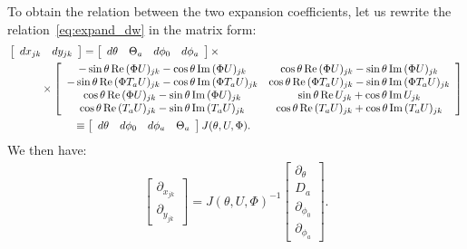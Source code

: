 \documentclass[12pt]{article}
\begin{document}
To obtain the relation between the two expansion coefficients,
let us rewrite the relation~\eqref{eq:expand_dw}
in the matrix form:
\begin{align}
  &\left[
    \begin{array}{c c}
      dx_{jk}
      &
        dy_{jk}
    \end{array}
    \right]
    =
    \left[
    \begin{array}{c c c c}
      d\theta & \Theta_a & d\phi_0 & d\phi_a
    \end{array}
    \right]
    \times
    \nonumber\\
  &~~~~~~~~~
    \times
    \left[
    \begin{array}{c c}
      -\sin\theta\, {\rm Re}\,(\Phi U)_{jk}-\cos\theta\,{\rm Im}\,(\Phi U)_{jk}
      &
        \cos\theta\, {\rm Re}\,(\Phi U)_{jk}-\sin\theta\,{\rm Im}\,(\Phi U)_{jk}
      \\
      -\sin\theta\, {\rm Re}\,(\Phi T_aU)_{jk}-\cos\theta\,{\rm Im}\,(\Phi T_aU)_{jk}
      &
        \cos\theta\, {\rm Re}\,(\Phi T_aU)_{jk}-\sin\theta\,{\rm Im}\,(\Phi T_aU)_{jk}
      \\
      \cos\theta\, {\rm Re}\,(\Phi U)_{jk}-\sin\theta\,{\rm Im}\,(\Phi U)_{jk}
      &
        \sin\theta\, {\rm Re}\,U_{jk}+\cos\theta\,{\rm Im}\,U_{jk}
      \\
      \cos\theta\, {\rm Re}\,(T_aU)_{jk}-\sin\theta\,{\rm Im}\,(T_aU)_{jk}
      &
        \cos\theta\, {\rm Re}\,(T_aU)_{jk}+\cos\theta\,{\rm Im}\,(T_aU)_{jk}
    \end{array}
    \right]
    \nonumber\\
  &
    ~~~~~~~~~~~~~~~~~~
    \equiv
    \left[
    \begin{array}{c c c c}
      d\theta & d\phi_0 & d\phi_a & \Theta_a
    \end{array}
    \right]
    J(\theta, U, \Phi).
    \label{eq:transf}
\end{align}
We then have:
\begin{align}
  \left[
  \begin{array}{c}
    \partial_{x_{jk}}
    \\
    \partial_{y_{jk}}
  \end{array}
  \right]
  =
  J(\theta, U, \Phi)^{-1}
  \left[
  \begin{array}{c}
    \partial_\theta
    \\
    D_a
    \\
    \partial_{\phi_0}
    \\
    \partial_{\phi_a}
  \end{array}
  \right].
\end{align}
\end{document}
